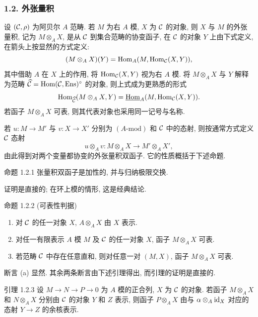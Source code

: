 \subsubsection*{1.2. 外张量积}
设 $(\mathcal C,\rho)$ 为阿贝尔 $A$ 范畴. 若 $M$ 为右 $A$ 模, $X$ 为 $\mathcal C$ 的对象, 则 $X$ 与 $M$ 的外张量积, 记为 $M\otimes_A X$, 是从 $\mathcal C$ 到集合范畴的协变函子, 在 $\mathcal C$ 的对象 $Y$ 上由下式定义, 在箭头上按显然的方式定义:
\[
(M\otimes_A X)(Y)=\operatorname{Hom}_A(M,\operatorname{Hom}_{\mathcal C}(X,Y)),
\]
其中借助 $A$ 在 $X$ 上的作用, 将 $\operatorname{Hom}_{\mathcal C}(X,Y)$ 视为右 $A$ 模. 将 $M\otimes_AX$ 与 $Y$ 解释为范畴 $\widehat{\mathcal C}=\operatorname{Hom}(\mathcal C,\operatorname{Ens})^{\circ}$ 的对象, 则上式成为更熟悉的形式
\[
\operatorname{Hom}_{\widehat{\mathcal C}}(M\otimes_A X,Y)=\underline{\operatorname{Hom}}_A(M,\operatorname{Hom}_{\mathcal C}(X,Y)).
\]
若函子 $M\otimes_A X$ 可表, 则其代表对象也采用同一记号与名称.

若 $u:M\to M'$ 与 $v:X\to X'$ 分别为 $(A\text{-mod})$ 和 $\mathcal C$ 中的态射, 则按通常方式定义 $\mathcal C$ 态射
\[
u\otimes_A v:M\otimes_A X\longrightarrow M'\otimes_A X',
\]
由此得到对两个变量都协变的外张量积双函子. 它的性质概括于下述命题.

\begin{statement}{命题 1.2.1}
张量积双函子是加性的, 并与归纳极限交换.
\end{statement}
证明是直接的; 在环上模的情形, 这是经典结论.

\begin{statement}{命题 1.2.2 (可表性判据)}
\begin{enumerate}[label=(\alph*)]
\item 对 $\mathcal C$ 的任一对象 $X$, $A\otimes_AX$ 由 $X$ 表示.
\item 对任一有限表示 $A$ 模 $M$ 及 $\mathcal C$ 的任一对象 $X$, 函子 $M\otimes_AX$ 可表.
\item 若范畴 $\mathcal C$ 中存在任意直和, 则对任意一对 $(M,X)$, 函子 $M\otimes_A X$ 可表.
\end{enumerate}
\end{statement}

\begin{prooftext}[证明]
断言 (a) 显然. 其余两条断言由下述引理得出, 而引理的证明是直接的.
\end{prooftext}

\begin{statement}{引理 1.2.3}
设 $M\to N\to P\to0$ 为 $A$ 模的正合列, $X$ 为 $\mathcal C$ 的对象. 若函子 $M\otimes_A X$ 和 $N\otimes_A X$ 分别由 $\mathcal C$ 的对象 $Y$ 和 $Z$ 表示, 则函子 $P\otimes_A X$ 由与 $\alpha\otimes_A\operatorname{id}_X$ 对应的态射 $Y\to Z$ 的余核表示.
\end{statement}

